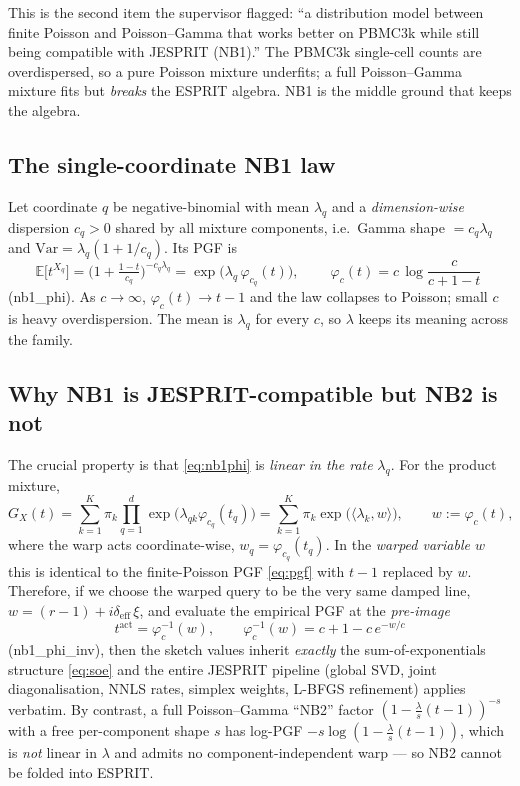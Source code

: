 \documentclass[11pt]{article}
\newcommand{\E}{\mathbb{E}}
\newcommand{\inner}[2]{\langle #1, #2 \rangle}
\newcommand{\lam}{\bm{\lambda}}
\newcommand{\bt}{\bm{t}}
\newcommand{\bxi}{\bm{\xi}}
\newcommand{\deff}{\delta_{\mathrm{eff}}}
\newcommand{\code}[1]{\texttt{\small #1}}
\def\code#1{#1}%
\def\small{}%
\def\bm#1{#1}%
\def\bt{t}%
\theoremstyle{definition}
\begin{document}
This is the second item the supervisor flagged: ``a distribution model between finite Poisson
and Poisson--Gamma that works better on PBMC3k while still being compatible with JESPRIT
(NB1).'' The PBMC3k single-cell counts are overdispersed, so a pure Poisson mixture
underfits; a full Poisson--Gamma mixture fits but \emph{breaks} the ESPRIT algebra. NB1 is the
middle ground that keeps the algebra.

\subsection{The single-coordinate NB1 law}
Let coordinate $q$ be negative-binomial with mean $\lambda_q$ and a \emph{dimension-wise}
dispersion $c_q>0$ shared by all mixture components, i.e.\ Gamma shape $=c_q\lambda_q$ and
$\mathrm{Var}=\lambda_q(1+1/c_q)$. Its PGF is
\begin{equation}
\E\!\big[t^{X_q}\big]
 = \Big(1+\tfrac{1-t}{c_q}\Big)^{-c_q\lambda_q}
 = \exp\!\big(\lambda_q\,\varphi_{c_q}(t)\big),
\qquad
\boxed{\ \varphi_{c}(t)=c\,\log\!\frac{c}{c+1-t}\ }
\label{eq:nb1phi}
\end{equation}
(\code{nb1\_phi}). As $c\to\infty$, $\varphi_c(t)\to t-1$ and the law collapses to Poisson; small
$c$ is heavy overdispersion. The mean is $\lambda_q$ for every $c$, so $\lambda$ keeps its
meaning across the family.

\subsection{Why NB1 is JESPRIT-compatible but NB2 is not}
The crucial property is that \eqref{eq:nb1phi} is \emph{linear in the rate} $\lambda_q$.
For the product mixture,
\begin{equation}
G_X(\bt)=\sum_{k=1}^{K}\pi_k\prod_{q=1}^d \exp\!\big(\lambda_{qk}\varphi_{c_q}(t_q)\big)
        =\sum_{k=1}^{K}\pi_k\exp\!\big(\inner{\lam_k}{\bm w}\big),
\qquad \bm w := \bm\varphi_{\bm c}(\bt),
\label{eq:nb1pgf}
\end{equation}
where the warp acts coordinate-wise, $w_q=\varphi_{c_q}(t_q)$. In the \emph{warped variable
$\bm w$} this is identical to the finite-Poisson PGF \eqref{eq:pgf} with $\bt-\bm1$ replaced by
$\bm w$. Therefore, if we choose the warped query to be the very same damped line,
$\bm w=(r-1)+i\deff\,\bxi$, and evaluate the empirical PGF at the \emph{pre-image}
\begin{equation}
\bt^{\mathrm{act}} = \bm\varphi_{\bm c}^{-1}(\bm w),
\qquad
\varphi_c^{-1}(w)=c+1-c\,e^{-w/c}
\label{eq:nb1inv}
\end{equation}
(\code{nb1\_phi\_inv}), then the sketch values inherit \emph{exactly} the sum-of-exponentials
structure \eqref{eq:soe} and the entire JESPRIT pipeline (global SVD, joint diagonalisation,
NNLS rates, simplex weights, L-BFGS refinement) applies verbatim. By contrast, a full
Poisson--Gamma ``NB2'' factor $(1-\frac{\lambda}{s}(t-1))^{-s}$ with a free per-component shape
$s$ has log-PGF $-s\log(1-\frac{\lambda}{s}(t-1))$, which is \emph{not} linear in $\lambda$ and
admits no component-independent warp --- so NB2 cannot be folded into ESPRIT.
\end{document}
